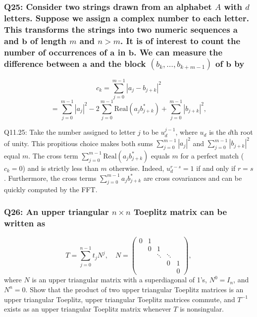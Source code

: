 \documentclass[8pt]{article}
\begin{document}
\subsubsection*{Q25: Consider two strings drawn from an alphabet \(A\) with \(d\) letters. Suppose we assign a complex number to each letter. This transforms the strings into two numeric sequences \(\mathbf{a}\) and \(\mathbf{b}\) of length \(m\) and \(n > m\). It is of interest to count the number of occurrences of \(\mathbf{a}\) in \(\mathbf{b}\). We can measure the difference between \(\mathbf{a}\) and the block \((b_k, \ldots, b_{k+m-1})\) of \(\mathbf{b}\) by}
\[
c_k = \sum_{j=0}^{m-1} |a_j - b_{j+k}|^2
\]
\[
= \sum_{j=0}^{m-1} |a_j|^2 - 2 \sum_{j=0}^{m-1} \text{Real}(a_j b_{j+k}^*) + \sum_{j=0}^{m-1} |b_{j+k}|^2,
\]

Q11.25: Take the number assigned to letter \(j\) to be \(u_d^{j-1}\), where \(u_d\) is the \(d\)th root of unity. This propitious choice makes both sums \(\sum_{j=0}^{m-1} |a_j|^2\) and \(\sum_{j=0}^{m-1} |b_{j+k}|^2\) equal \(m\). The cross term \(\sum_{j=0}^{m-1} \text{Real}(a_j b_{j+k}^*)\) equals \(m\) for a perfect match (\(c_k = 0\)) and is strictly less than \(m\) otherwise. Indeed, \(u_d^{r-s} = 1\) if and only if \(r = s\). Furthermore, the cross terms \(\sum_{j=0}^{m-1} a_j b_{j+k}^*\) are cross covariances and can be quickly computed by the FFT.

\subsubsection*{Q26: An upper triangular \(n \times n\) Toeplitz matrix can be written as}
\[
T = \sum_{j=0}^{n-1} t_j N^j, \quad N = \begin{pmatrix}
0 & 1 & & & \\
& 0 & 1 & & \\
& & \ddots & \ddots & \\
& & & 0 & 1 \\
& & & & 0
\end{pmatrix},
\]
where \(N\) is an upper triangular matrix with a superdiagonal of 1's, \(N^0 = I_n\), and \(N^n = 0\). Show that the product of two upper triangular Toeplitz matrices is an upper triangular Toeplitz, upper triangular Toeplitz matrices commute, and \(T^{-1}\) exists as an upper triangular Toeplitz matrix whenever \(T\) is nonsingular.
\end{document}
